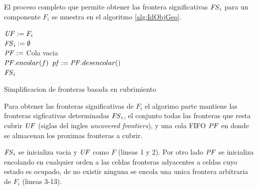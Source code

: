 El proceso completo que permite obtener las frontera significativas
$\mathit{FS}_i$ para un componente $F_i$ se muestra en el algoritmo
\ref{alg:IdObjGeo}.

\begin{algorithm}[H]
\SetAlgoLined

  $\mathit{UF} := F_i$ \\
  $\mathit{FS}_i := \emptyset$\\

  $\mathit{PF} :=$ Cola vacia \\
   {
     {
       {
        $\mathit{PF}.encolar(f)$
      }
    }
  }
   {
    $\mathit{pf} := \mathit{PF}.desencolar()$\\
  }
  \Return $\mathit{FS}_i$ 

  \caption{Simplificacion de fronteras basada en cubrimiento}
  \label{alg:IdObjGeo}
\end{algorithm}

Para obtener las fronteras significativas de $F_i$ el algorimo parte mantiene
las fronteras sigficativas determinadas $\mathit{FS}_i$, el conjunto
todas las fronteras que resta cubrir $\mathit{UF}$ (siglas del ingles
\emph{uncovered frontiers}), y  una cola FIFO $\mathit{PF}$ en donde se almacenan 
los proximas fronteras a cubrir.

$\mathit{FS}_i$ se inicializa vacia y $\mathit{UF}$ como $F$ (lineas 1 y 2). Por otro
lado $\mathit{PF}$ se inicializa encolando en cualquier orden a las celdas
fronteras adyacentes a celdas cuyo estado es ocupado, de no existir ninguna se
encola una unica frontera arbitraria de $F_i$ (lineas 3-13). 

